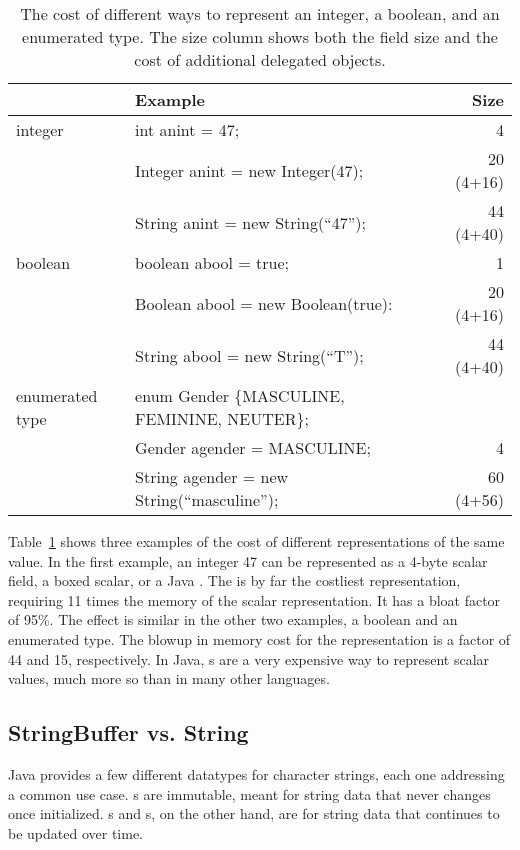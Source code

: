 \begin{table}
  \centering
\begin{tabular}{llr} \toprule \toprule
& Example & Size \\ \midrule \midrule
integer & int anint = 47; & 4 \\
\midrule
& Integer anint = new Integer(47); & 20 (4+16)  \\
\midrule
& String anint = new String(``47''); & 44 (4+40) \\
\midrule
\midrule
boolean & boolean abool = true; & 1\\
\midrule
& Boolean abool = new Boolean(true): & 20 (4+16) \\
\midrule
& String abool = new String(``T''); & 44 (4+40) \\
\midrule \midrule
enumerated type & enum Gender \{MASCULINE, FEMININE, NEUTER\}; &\\
& Gender agender = MASCULINE; & 4 \\
\midrule
& String agender = new String(``masculine''); & 60 (4+56) \\
\bottomrule \bottomrule
\end{tabular}
\caption{The cost of different ways to represent an integer, a boolean, and an
enumerated type. The size column shows both the field size and the cost of
additional delegated objects.}
\label{tab:data-sizes}
\end{table}

Table~\ref{tab:data-sizes} shows three examples of the cost of different
representations of the same value. In the first example, an integer 47 can be
represented as a 4-byte scalar field, a boxed scalar, or a Java . 
The  is by far the costliest representation, requiring 11 times
the memory of the scalar representation. It has a bloat factor of 95\%.
The effect is similar in the other two examples, a boolean and an enumerated
type. The blowup in memory cost for the  representation is a
factor of 44 and 15, respectively. In Java, s are a very expensive way to
represent scalar values, much more so than in many other languages.

\subsection{StringBuffer vs. String}
Java provides a few different datatypes for character strings, each one
addressing a common use case. s are immutable, meant for
string data that never changes once initialized. s and
s, on the other hand, are for string data that continues to
be updated over time.

